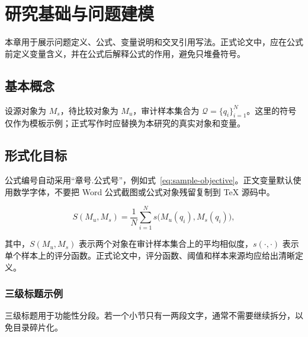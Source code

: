 \chapter{研究基础与问题建模}
\label{chap:foundation}

本章用于展示问题定义、公式、变量说明和交叉引用写法。正式论文中，应在公式前定义变量含义，并在公式后解释公式的作用，避免只堆叠符号。

\section{基本概念}
\label{sec:basic-concepts}

设源对象为 $M_s$，待比较对象为 $M_u$，审计样本集合为 $\mathcal{Q}=\{q_i\}_{i=1}^{N}$。这里的符号仅作为模板示例；正式写作时应替换为本研究的真实对象和变量。

\section{形式化目标}
\label{sec:formal-objective}

公式编号自动采用“章号.公式号”，例如式~\eqref{eq:sample-objective}。正文变量默认使用数学字体，不要把 Word 公式截图或公式对象残留复制到 TeX 源码中。

\begin{equation}
  S(M_u,M_s)=\frac{1}{N}\sum_{i=1}^{N}s\bigl(M_u(q_i),M_s(q_i)\bigr),
  \label{eq:sample-objective}
\end{equation}

其中，$S(M_u,M_s)$ 表示两个对象在审计样本集合上的平均相似度，$s(\cdot,\cdot)$ 表示单个样本上的评分函数。正式论文中，评分函数、阈值和样本来源均应给出清晰定义。

\subsection{三级标题示例}
\label{subsec:third-level-example}

三级标题用于功能性分段。若一个小节只有一两段文字，通常不需要继续拆分，以免目录碎片化。
